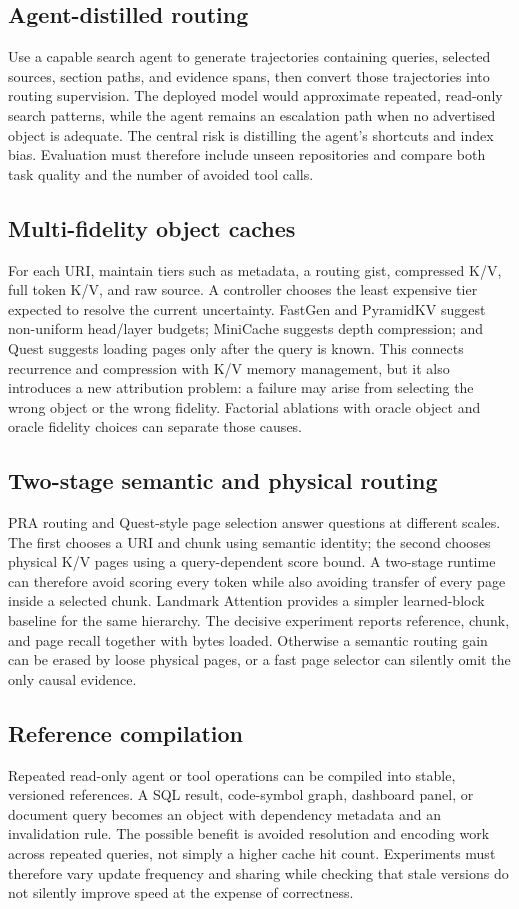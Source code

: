 \documentclass[10pt,a4paper]{article}
\begin{document}
\subsection{Agent-distilled routing}
Use a capable search agent to generate trajectories containing queries, selected sources,
section paths, and evidence spans, then convert those trajectories into routing
supervision.  The deployed model would approximate repeated, read-only search patterns,
while the agent remains an escalation path when no advertised object is adequate.  The
central risk is distilling the agent's shortcuts and index bias.  Evaluation must
therefore include unseen repositories and compare both task quality and the number of
avoided tool calls.

\subsection{Multi-fidelity object caches}
For each URI, maintain tiers such as metadata, a routing gist, compressed K/V, full token
K/V, and raw source.  A controller chooses the least expensive tier expected to resolve
the current uncertainty. FastGen and PyramidKV suggest non-uniform head/layer budgets;
MiniCache suggests depth compression; and Quest suggests loading pages only after the
query is known. This connects recurrence and compression with K/V memory
management, but it also introduces a new attribution problem: a failure may arise from
selecting the wrong object or the wrong fidelity.  Factorial ablations with oracle object
and oracle fidelity choices can separate those causes.

\subsection{Two-stage semantic and physical routing}
PRA routing and Quest-style page selection answer questions at different scales. The first
chooses a URI and chunk using semantic identity; the second chooses physical K/V pages
using a query-dependent score bound. A two-stage runtime can therefore avoid scoring every
token while also avoiding transfer of every page inside a selected chunk. Landmark
Attention provides a simpler learned-block baseline for the same hierarchy. The decisive
experiment reports reference, chunk, and page recall together with bytes loaded. Otherwise
a semantic routing gain can be erased by loose physical pages, or a fast page selector can
silently omit the only causal evidence.

\subsection{Reference compilation}
Repeated read-only agent or tool operations can be compiled into stable, versioned
references.  A SQL result, code-symbol graph, dashboard panel, or document query becomes
an object with dependency metadata and an invalidation rule.  The possible benefit is
avoided resolution and encoding work across repeated queries, not simply a higher cache
hit count.  Experiments must therefore vary update frequency and sharing while checking
that stale versions do not silently improve speed at the expense of correctness.
\end{document}
